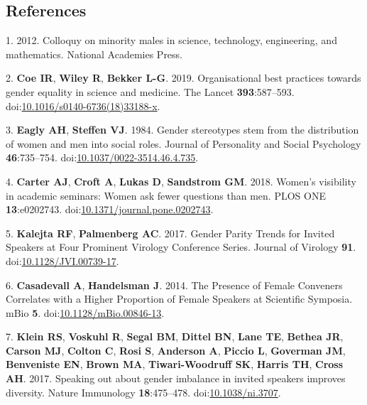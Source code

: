 \documentclass[10pt,]{article}
\begin{document}
\subsection{References}\label{references}

\hypertarget{refs}{}
\hypertarget{ref-colloquy_2012}{}
1. 2012. Colloquy on minority males in science, technology, engineering,
and mathematics. National Academies Press.

\hypertarget{ref-Coe2019}{}
2. \textbf{Coe IR}, \textbf{Wiley R}, \textbf{Bekker L-G}. 2019.
Organisational best practices towards gender equality in science and
medicine. The Lancet \textbf{393}:587--593.
doi:\href{https://doi.org/10.1016/s0140-6736(18)33188-x}{10.1016/s0140-6736(18)33188-x}.

\hypertarget{ref-Eagly1984}{}
3. \textbf{Eagly AH}, \textbf{Steffen VJ}. 1984. Gender stereotypes stem
from the distribution of women and men into social roles. Journal of
Personality and Social Psychology \textbf{46}:735--754.
doi:\href{https://doi.org/10.1037/0022-3514.46.4.735}{10.1037/0022-3514.46.4.735}.

\hypertarget{ref-Carter2018}{}
4. \textbf{Carter AJ}, \textbf{Croft A}, \textbf{Lukas D},
\textbf{Sandstrom GM}. 2018. Women's visibility in academic seminars:
Women ask fewer questions than men. PLOS ONE \textbf{13}:e0202743.
doi:\href{https://doi.org/10.1371/journal.pone.0202743}{10.1371/journal.pone.0202743}.

\hypertarget{ref-kalejta_gender_2017}{}
5. \textbf{Kalejta RF}, \textbf{Palmenberg AC}. 2017. Gender Parity
Trends for Invited Speakers at Four Prominent Virology Conference
Series. Journal of Virology \textbf{91}.
doi:\href{https://doi.org/10.1128/JVI.00739-17}{10.1128/JVI.00739-17}.

\hypertarget{ref-casadevall_presence_2014}{}
6. \textbf{Casadevall A}, \textbf{Handelsman J}. 2014. The Presence of
Female Conveners Correlates with a Higher Proportion of Female Speakers
at Scientific Symposia. mBio \textbf{5}.
doi:\href{https://doi.org/10.1128/mBio.00846-13}{10.1128/mBio.00846-13}.

\hypertarget{ref-klein_speaking_2017}{}
7. \textbf{Klein RS}, \textbf{Voskuhl R}, \textbf{Segal BM},
\textbf{Dittel BN}, \textbf{Lane TE}, \textbf{Bethea JR}, \textbf{Carson
MJ}, \textbf{Colton C}, \textbf{Rosi S}, \textbf{Anderson A},
\textbf{Piccio L}, \textbf{Goverman JM}, \textbf{Benveniste EN},
\textbf{Brown MA}, \textbf{Tiwari-Woodruff SK}, \textbf{Harris TH},
\textbf{Cross AH}. 2017. Speaking out about gender imbalance in invited
speakers improves diversity. Nature Immunology \textbf{18}:475--478.
doi:\href{https://doi.org/10.1038/ni.3707}{10.1038/ni.3707}.
\end{document}
